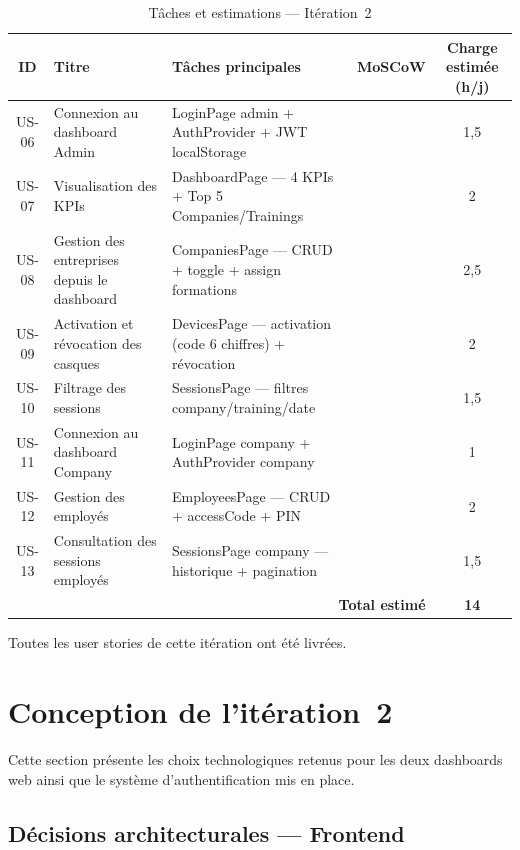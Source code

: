 \begin{table}[H]
  \centering
  \small
  \setlength{\tabcolsep}{5pt}
  \begin{tabularx}{\textwidth}{cp{3.5cm}Xc>{\footnotesize}c}
    \toprule
    \textbf{ID} & \textbf{Titre} & \textbf{Tâches principales} & \textbf{MoSCoW} & \textbf{Charge estimée (h/j)} \\
    \midrule
    US-06 & Connexion au dashboard Admin &
      LoginPage admin + AuthProvider + JWT localStorage & \must{} & 1,5 \\
    US-07 & Visualisation des KPIs &
      DashboardPage --- 4 KPIs + Top 5 Companies/Trainings & \must{} & 2 \\
    US-08 & Gestion des entreprises depuis le dashboard &
      CompaniesPage --- CRUD + toggle + assign formations & \must{} & 2,5 \\
    US-09 & Activation et révocation des casques &
      DevicesPage --- activation (code 6 chiffres) + révocation & \must{} & 2 \\
    US-10 & Filtrage des sessions &
      SessionsPage --- filtres company/training/date & \should{} & 1,5 \\
    US-11 & Connexion au dashboard Company &
      LoginPage company + AuthProvider company & \must{} & 1 \\
    US-12 & Gestion des employés &
      EmployeesPage --- CRUD + accessCode + PIN & \must{} & 2 \\
    US-13 & Consultation des sessions employés &
      SessionsPage company --- historique + pagination & \should{} & 1,5 \\
    \midrule
    \multicolumn{4}{r}{\textbf{Total estimé}} & \textbf{14} \\
    \bottomrule
  \end{tabularx}
  \caption{Tâches et estimations --- Itération~2}
  \label{tab:backlog_s2}
\end{table}

\noindent Toutes les user stories de cette itération ont été livrées.

\section{Conception de l'itération~2}

Cette section présente les choix technologiques retenus pour les deux dashboards web
ainsi que le système d'authentification mis en place.

\subsection{Décisions architecturales --- Frontend}


